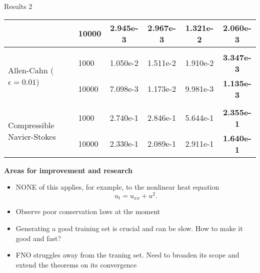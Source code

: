 \documentclass{beamer}
\begin{document}
\begin{frame}{Results 2}
\begin{table}[htbp]
{\begin{sc}
\begin{tabular}{llcccc}
                                 & 10000                    & 2.945e-3     & 2.967e-3     & 1.321e-2     & \textbf{2.060e-3} \\ \midrule
\\
\multirow{2}{*}{Allen-Cahn ($\epsilon=0.01$)} & 1000                     & 1.050e-2     & 1.511e-2     & 1.910e-2     & \textbf{3.347e-3} \\ 
                                 & 10000                    & 7.098e-3     & 1.173e-2     & 9.981e-3     & \textbf{1.135e-3} \\ \midrule
\\
\multirow{2}{*}{Compressible Navier-Stokes} & 1000                     & 2.740e-1     & 2.846e-1     & 5.644e-1     & \textbf{2.355e-1} \\ 
                                 & 10000                    & 2.330e-1     & 2.089e-1     & 2.911e-1     & \textbf{1.640e-1} \\ \bottomrule
\end{tabular}
\end{sc}
}
\end{table}

\end{frame}



\begin{frame}

{\bf Areas for improvement and research} 

\vspace{0.2in}


\begin{itemize}

\item NONE of this applies, for example, to the {\color{red} nonlinear} heat equation
$$u_t = u_{xx} + u^2.$$

\item Observe poor conservation laws at the moment

\item Generating a {\color{blue} good training set} is crucial and can be {\color{red} slow}. How to make it good and fast?

\item FNO struggles away from the traning set. Need to broaden its scope and extend the theorems on its convergence

\end{itemize}

\end{frame}
\end{document}

